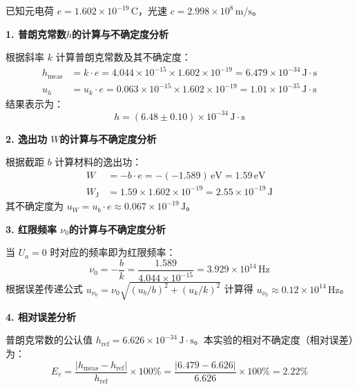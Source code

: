 \documentclass[10pt,a4paper]{ctexart}
\begin{document}
已知元电荷 $e = 1.602 \times 10^{-19} \, \text{C}$，光速 $c = 2.998 \times 10^{8} \, \text{m/s}$。

\vspace{0.3cm}
\noindent\textbf{1. 普朗克常数$h$的计算与不确定度分析 }

根据斜率 $k$ 计算普朗克常数及其不确定度：
\begin{align*}
    h_{\text{meas}} &= k \cdot e = 4.044 \times 10^{-15} \times 1.602 \times 10^{-19} = 6.479 \times 10^{-34} \, \text{J}\cdot\text{s} \\
    u_h &= u_k \cdot e = 0.063 \times 10^{-15} \times 1.602 \times 10^{-19} = 1.01 \times 10^{-35} \, \text{J}\cdot\text{s}
\end{align*}
结果表示为：
\begin{equation*}
    h = (6.48 \pm 0.10) \times 10^{-34} \, \text{J}\cdot\text{s}
\end{equation*}

\vspace{0.3cm}
\noindent\textbf{2. 逸出功 $W$的计算与不确定度分析}

根据截距 $b$ 计算材料的逸出功：
\begin{align*}
    W &= -b \cdot e = -(-1.589) \, \text{eV} = 1.59 \, \text{eV} \\
    W_{\text{J}} &= 1.59 \times 1.602 \times 10^{-19} = 2.55 \times 10^{-19} \, \text{J}
\end{align*}
其不确定度为 $u_W = u_b \cdot e \approx 0.067 \times 10^{-19} \, \text{J}$。

\vspace{0.3cm}
\noindent\textbf{3. 红限频率 $\nu_0$的计算与不确定度分析}

当 $U_a = 0$ 时对应的频率即为红限频率：
\begin{equation*}
    \nu_0 = -\frac{b}{k} = \frac{1.589}{4.044 \times 10^{-15}} = 3.929 \times 10^{14} \, \text{Hz}
\end{equation*}
根据误差传递公式 $u_{\nu_0} = \nu_0 \sqrt{(u_b/b)^2 + (u_k/k)^2}$ 计算得 $u_{\nu_0} \approx 0.12 \times 10^{14} \, \text{Hz}$。

\noindent\textbf{4. 相对误差分析}

普朗克常数的公认值 $h_{\text{ref}} = 6.626 \times 10^{-34} \, \text{J}\cdot\text{s}$。本实验的相对不确定度（相对误差）为：
\begin{equation*}
    E_r = \frac{|h_{\text{meas}} - h_{\text{ref}}|}{h_{\text{ref}}} \times 100\% = \frac{|6.479 - 6.626|}{6.626} \times 100\% = 2.22\%
\end{equation*}
\end{document}
